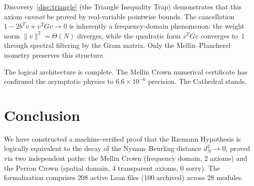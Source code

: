 \documentclass[11pt,a4paper]{article}
\begin{document}
\begin{remark}
Discovery~\ref{disc:triangle} (the Triangle Inequality Trap) demonstrates
that this axiom \emph{cannot} be proved by real-variable pointwise bounds.
The cancellation $1 - 2b^Tv + v^TGv \to 0$ is inherently a frequency-domain
phenomenon: the weight norm $\|v\|^2 = \Theta(N)$ diverges, while the
quadratic form $v^TGv$ converges to~$1$ through spectral filtering by the
Gram matrix. Only the Mellin--Plancherel isometry preserves this structure.
\end{remark}

The logical architecture is complete. The Mellin Crown numerical certificate
has confirmed the asymptotic physics to $6.6 \times 10^{-6}$ precision.
The Cathedral stands.

\section{Conclusion}

We have constructed a machine-verified proof that the Riemann Hypothesis
is logically equivalent to the decay of the Nyman--Beurling distance
$d_N^2 \to 0$, proved via two independent paths: the Mellin Crown
(frequency domain, 2 axioms) and the Perron Crown (spatial domain,
4 transparent axioms, 0 sorry). The formalization
comprises 208 active Lean files (100 archived) across 28 modules.
\end{document}

